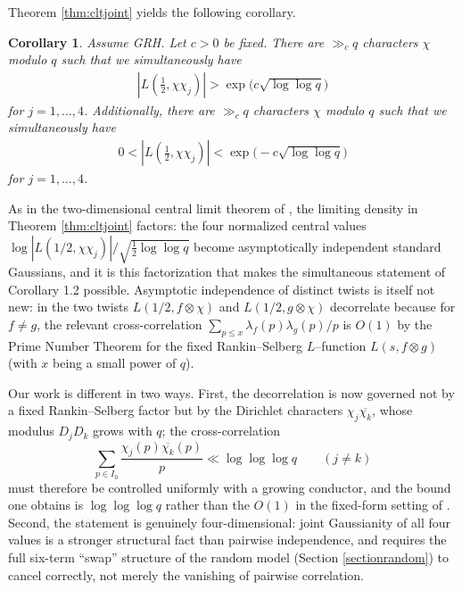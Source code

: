 \documentclass[12pt, reqno]{amsart}
\newtheorem{corollary}[theorem]{Corollary}
\numberwithin{equation}{section}
\numberwithin{theorem}{section}
\numberwithin{equation}{section}
\begin{document}
Theorem \ref{thm:cltjoint} yields the following corollary.
\begin{corollary} \label{cor:simul large vals}
	Assume GRH. Let $c>0$ be fixed. There are $\gg_{c} q$ characters $\chi$ modulo $q$ such that we simultaneously have
	\begin{align*}
		|L(\tfrac12, \chi\chi_j)| > \exp\Big(c \sqrt{\log\log q}\Big)
	\end{align*}
	for $j=1,\ldots, 4$. Additionally, there are $\gg_{c} q$ characters $\chi$ modulo $q$ such that we simultaneously have
	\begin{align*}
		0<|L(\tfrac12, \chi\chi_j)| < \exp\Big(-c \sqrt{\log\log q}\Big)
	\end{align*}
for $j=1,\ldots, 4$.
\end{corollary}

As in the two-dimensional central limit theorem of \cite{BELP}, the limiting density in Theorem \ref{thm:cltjoint}
factors: the four normalized central values
$\log|L(1/2,\chi\chi_j)|/\sqrt{\tfrac12\log\log q}$ become asymptotically
independent standard Gaussians, and it is this factorization that makes the
simultaneous statement of Corollary 1.2 possible. Asymptotic independence of distinct
twists is itself not new: in \cite{BELP} the two twists $L(1/2,f\otimes\chi)$ and
$L(1/2,g\otimes\chi)$ decorrelate because for $f\ne g$, the relevant cross-correlation
$\sum_{p \leq x} \lambda_f(p)\lambda_g(p)/p$ is $O(1)$ by the Prime Number Theorem for the
fixed Rankin--Selberg $L$--function $L(s,f\otimes g)$ (with $x$ being a small power of $q$).

Our work is different in two ways. First, the decorrelation is now governed not by a
fixed Rankin--Selberg factor but by the Dirichlet characters $\chi_j\overline{\chi_k}$,
whose modulus $D_jD_k$ grows with $q$; the cross-correlation
\[
\sum_{p\in I_0}\frac{\chi_j(p)\overline{\chi_k}(p)}{p} \ll \log\log\log q
\qquad(j\ne k)
\]
must therefore be controlled uniformly with a growing conductor, and the bound
one obtains is $\log\log\log q$ rather than the $O(1)$ in the fixed-form
setting of \cite{BELP}. Second, the statement is genuinely four-dimensional: joint
Gaussianity of all four values is a stronger structural fact than pairwise
independence, and requires the full six-term ``swap'' structure of the random model
(Section \ref{sectionrandom}) to cancel correctly, not merely the vanishing of pairwise correlation.
\end{document}
